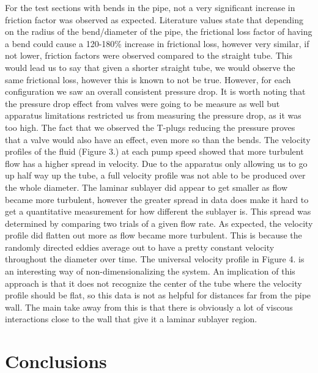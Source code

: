 \documentclass{article}
\begin{document}
For the test sections with bends in the pipe, not a very significant increase in friction factor was observed as expected. Literature values state that depending on the radius of the bend/diameter of the pipe, the frictional loss factor of having a bend could cause a 120-180\% increase in frictional loss, however very similar, if not lower, friction factors were observed compared to the straight tube. This would lead us to say that given a shorter straight tube, we would observe the same frictional loss, however this is known to not be true. However, for each configuration we saw an overall consistent pressure drop. It is worth noting that the pressure drop effect from valves were going to be measure as well but apparatus limitations restricted us from measuring the pressure drop, as it was too high. The fact that we observed the T-plugs reducing the pressure proves that a valve would also have an effect, even more so than the bends.
\linebreak
\linebreak
The velocity profiles of the fluid (Figure 3.) at each pump speed showed that more turbulent flow has a higher spread in velocity. Due to the apparatus only allowing us to go up half way up the tube, a full velocity profile was not able to be produced over the whole diameter. The laminar sublayer did appear to get smaller as flow became more turbulent, however the greater spread in data does make it hard to get a quantitative measurement for how different the sublayer is. This spread was determined by comparing two trials of a given flow rate. As expected, the velocity profile did flatten out more as flow became more turbulent. This is because the randomly directed eddies average out to have a pretty constant velocity throughout the diameter over time. The universal velocity profile in Figure 4. is an interesting way of non-dimensionalizing the system. An implication of this approach is that it does not recognize the center of the tube where the velocity profile should be flat, so this data is not as helpful for distances far from the pipe wall. The main take away from this is that there is obviously a lot of viscous interactions close to the wall that give it a laminar sublayer region. 



\section*{Conclusions}
\end{document}

